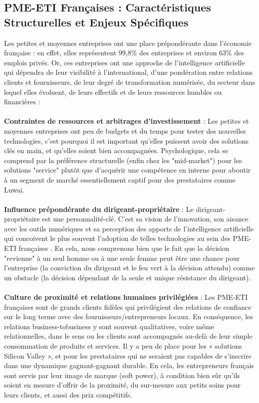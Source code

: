 \subsection{PME-ETI Françaises : Caractéristiques Structurelles et Enjeux Spécifiques}

Les petites et moyennes entreprises ont une place prépondérante dans l'économie française : en effet, elles représentent 99,8\% des entreprises et environ 63\% des emplois privés. Or, ces entreprises ont une approche de l’intelligence artificielle qui dépendra de leur visibilité à l’international, d’une pondération entre relations clients et fournisseurs, de leur degré de transformation numérisée, du secteur dans lequel elles évoluent, de leurs effectifs et de leurs ressources humbles ou financières\cite{bpifrance2025ia, france_strategie2025make} :
\\\\
\textbf{Contraintes de ressources et arbitrages d'investissement} : Les petites et moyennes entreprises ont peu de budgets et du temps pour tester des nouvelles technologies, c’est pourquoi il est important qu’elles puissent avoir des solutions clés en main, et qu’elles soient bien accompagnées. Psychologique, cela se comprend par la préférence structurelle (enfin chez les "mid-market") pour les solutions "service" plutôt que d’acquérir une compétence en interne pour aboutir à un segment de marché essentiellement captif pour des prestataires comme Luwai.
\\\\
\textbf{Influence prépondérante du dirigeant-propriétaire} : Le dirigeant-propriétaire est une personnalité-clé. C’est sa vision de l’innovation, son aisance avec les outils numériques et sa perception des apports de l’intelligence artificielle qui concoivent le plus souvent l’adoption de telles technologies au sein des PME-ETI françaises \cite{bpifrance2017dirigeants}. En cela, nous comprenons bien que le fait que la décision "revienne" à un seul homme ou à une seule femme peut être une chance pour l’entreprise (la conviction du dirigeant et le feu vert à la décision attendu) comme un obstacle (la décision dépendant de la seule et unique résistance du dirigeant).
\\\\
\textbf{Culture de proximité et relations humaines privilégiées} : Les PME-ETI françaises sont de grands clients fidèles qui privilégient des relations de confiance sur le long terme avec des fournisseurs/entrepreneurs locaux. En conséquence, les relations business-tobusiness y sont souvent qualitatives, voire même relationnelles, dans le sens ou les clients sont accompagnés au-delà de leur simple consommation de produits et services. Il y a peu de place pour les « solutions Silicon Valley », et pour les prestataires qui ne seraient pas capables de s'inscrire dans une dynamique gagnant-gagnant durable. \cite{sage2025pme_transformation} En cela, les entrepreneurs français sont servis par leur image de marque (soft power), à condition bien sûr qu'ils soient en mesure d'offrir de la proximité, du sur-mesure aux petits soins pour leurs clients, et aussi des prix compétitifs.
